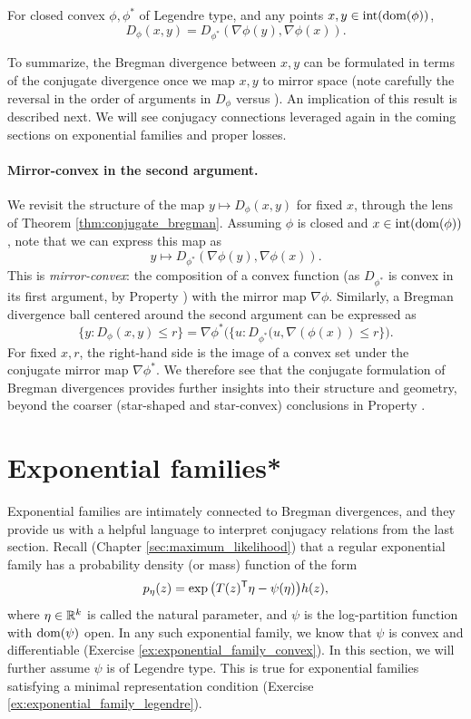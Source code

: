 \begin{Theorem}
\label{thm:conjugate_bregman}
For closed convex $\phi,\phi^*$ of Legendre type, and any points $x,y \in 
\operatorname{int}(\operatorname{dom}(\phi))$, 
\[
D_\phi(x,y) = D_{\phi^*}(\nabla\phi(y), \nabla\phi(x)). 
\]
\end{Theorem}

To summarize, the Bregman divergence between $x,y$ can be formulated in terms of
the conjugate divergence once we map $x,y$ to mirror space (note carefully the
reversal in the order of arguments in $D_\phi$ versus ). An
implication of this result is described next. We will see conjugacy connections 
leveraged again in the coming sections on exponential families and proper
losses.    

\paragraph{Mirror-convex in the second argument.}

We revisit the structure of the map $y \mapsto D_\phi(x,y)$ for fixed 
$x$, through the lens of Theorem \ref{thm:conjugate_bregman}. Assuming $\phi$
is closed and $x \in \operatorname{int}(\operatorname{dom}(\phi))$, note that we can express this map as  
\[
y \mapsto D_{\phi^*}(\nabla\phi(y), \nabla\phi(x)).
\]
This is \emph{mirror-convex}: the composition of a convex function (as 
$D_{\phi^*}$ is convex in its first argument, by Property
) with the mirror map $\nabla\phi$. 
Similarly, a Bregman divergence ball centered around the second argument can be
expressed as 
\[
\{ y : D_\phi(x,y) \leq r \} = \nabla\phi^*\Big( \big\{ u : D_{\phi^*}(u,
\nabla(\phi(x)) \leq r \big\} \Big).
\]
For fixed $x,r$, the right-hand side is the image of a convex set under the
conjugate mirror map $\nabla\phi^*$. We therefore see that the conjugate
formulation of Bregman divergences provides further insights into their
structure and geometry, beyond the coarser (star-shaped and star-convex)
conclusions in Property .       

\section{Exponential families*}

Exponential families are intimately connected to Bregman divergences, and they
provide us with a helpful language to interpret conjugacy relations from the
last section. Recall (Chapter \ref{sec:maximum_likelihood}) that a regular
exponential family has a probability density (or mass) function of the form           
\[
p_\eta(z) = \exp\big(T(z)^{\mathsf{T}} \eta - \psi(\eta)\big) h(z),
\]
where $\eta \in \mathbb{R}^k$ is called the natural parameter, and $\psi$ is the
log-partition function with $\operatorname{dom}(\psi)$ open. In any such exponential 
family, we know that $\psi$ is convex and differentiable (Exercise
\ref{ex:exponential_family_convex}). In this section, we will further assume
$\psi$ is of Legendre type. This is true for exponential families satisfying a
minimal representation condition (Exercise
\ref{ex:exponential_family_legendre}).       


